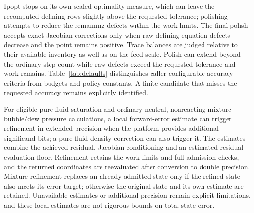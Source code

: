 Ipopt stops on its own scaled optimality measure, which can leave the recomputed defining rows slightly above the requested tolerance; polishing attempts to reduce the remaining defects within the work limits.
The final polish accepts exact-Jacobian corrections only when raw defining-equation defects decrease and the point remains positive.
Trace balances are judged relative to their available inventory as well as on the feed scale.
Polish can extend beyond the ordinary step count while raw defects exceed the requested tolerance and work remains.
Table~\ref{tab:defaults} distinguishes caller-configurable accuracy criteria from budgets and policy constants.
A finite candidate that misses the requested accuracy remains explicitly identified.

For eligible pure-fluid saturation and ordinary neutral, nonreacting mixture bubble/dew pressure calculations, a local forward-error estimate can trigger refinement in extended precision when the platform provides additional significand bits; a pure-fluid density correction can also trigger it.
The estimates combine the achieved residual, Jacobian conditioning and an estimated residual-evaluation floor.
Refinement retains the work limits and full admission checks, and the returned coordinates are reevaluated after conversion to double precision.
Mixture refinement replaces an already admitted state only if the refined state also meets its error target; otherwise the original state and its own estimate are retained.
Unavailable estimates or additional precision remain explicit limitations, and these local estimates are not rigorous bounds on total state error.


